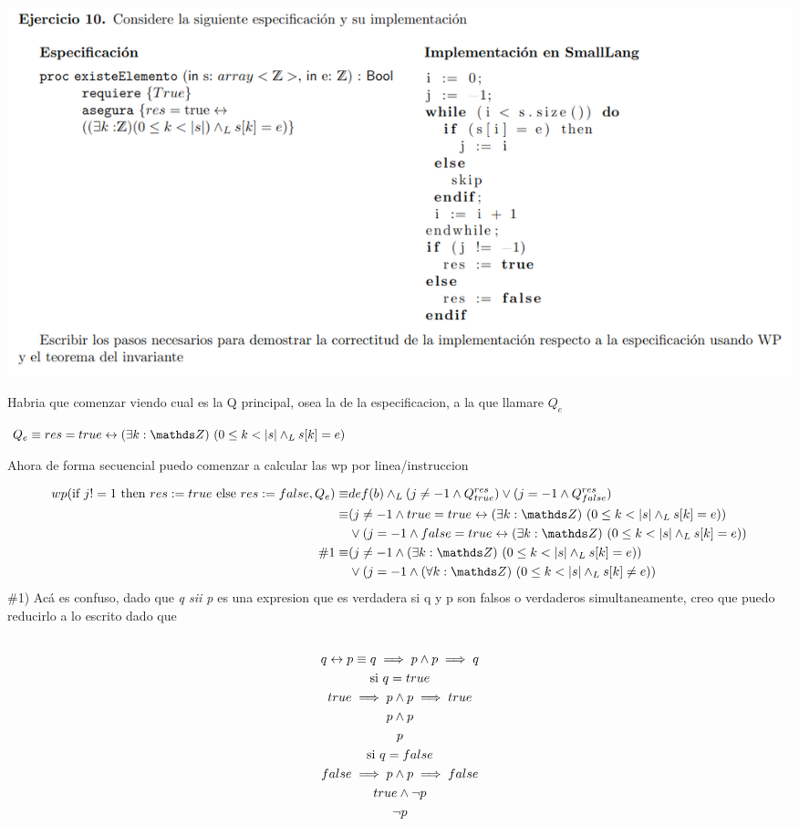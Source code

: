 \documentclass[a4paper,10pt]{article}
\begin{document}
    \pagebreak

    \includegraphics*[width=\textwidth]{e10.png}

    Habria que comenzar viendo cual es la Q principal, osea la de la especificacion, a la que llamare $Q_e$

$Q_e\equiv res=true \sii \existe[unalinea]{k}{\ent}{0\leq k < |s| \land_L s[k]=e}$

    Ahora de forma secuencial puedo comenzar a calcular las wp por linea/instruccion

    \begin{align*}
        wp(\text{if $j!=1$ then $res:=true$ else $res:=false$}, Q_e)\equiv & def(b)\land_L (j\not= -1\land Q_{true}^{res}) \lor (j=-1 \land Q_{false}^{res})            \\
        \equiv                                                             & (j\not=-1 \land true=true \sii \existe[unalinea]{k}{\ent}{0\leq k < |s| \land_L s[k]=e})   \\
                                                                           & \lor (j=-1 \land false=true \sii \existe[unalinea]{k}{\ent}{0\leq k < |s| \land_L s[k]=e}) \\
        \# 1\equiv                                                         & (j\not=-1 \land \existe[unalinea]{k}{\ent}{0\leq k < |s| \land_L s[k]=e})                  \\
                                                                           & \lor (j=-1 \land \paraTodo[unalinea]{k}{\ent}{0\leq k < |s| \land_L s[k]\not=e}
        )
    \end{align*}
    \#1) Acá es confuso, dado que \emph{q sii p} es una expresion que es verdadera si q y p son falsos o verdaderos simultaneamente, creo que puedo reducirlo a lo escrito dado que
    \begin{multline*}
        \\q \leftrightarrow p \equiv q\implies p \land p \implies q
        \\\text{si }q=true
        \\true \implies p \land p \implies true
        \\p \land p
        \\p
        \\\text{si }q=false
        \\false \implies p \land p \implies false
        \\true \land \lnot p
        \\\lnot p
        \\
    \end{multline*}
\end{document}

